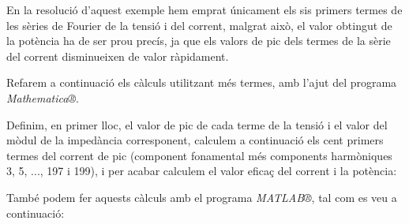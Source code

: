 \begin{exemple}
    En la resolució d'aquest exemple hem emprat únicament els sis
    primers termes de les sèries de Fourier de la tensió i del corrent,
    malgrat això, el valor  obtingut de la potència ha de ser prou precís, ja que
    els valors de pic dels termes de la sèrie del corrent disminueixen de
    valor ràpidament.

    Refarem a continuació els càlculs utilitzant més termes, amb l'ajut
    del programa
    \emph{Mathematica®}.   

    Definim, en primer lloc, el valor de pic de cada
     terme de la tensió i el valor del mòdul de la impedància corresponent,
    calculem a continuació els cent primers termes  del corrent de pic (component fonamental més components harmòniques 3, 5, ..., 197 i 199), i
    per acabar calculem el valor eficaç del corrent i la potència:

    \hspace{1cm}

    \hspace{1cm}

    \hspace{1cm}

    \hspace{1cm}

    \hspace{1cm}

    \hspace{1cm}

    \hspace{1cm}\newline

    També podem fer aquests càlculs amb el programa
    \emph{MATLAB®}, tal com es veu a continuació:


    \hspace{1cm}

    \hspace{1cm}

    \hspace{1cm}


\end{exemple}
